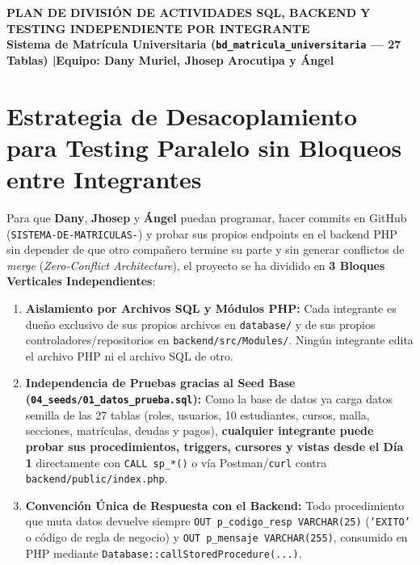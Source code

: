 \documentclass[10pt,a4paper,landscape]{article}
\begin{document}
\begin{center}
    {\LARGE \textbf{\textcolor{unjbgNavy}{PLAN DE DIVISIÓN DE ACTIVIDADES SQL, BACKEND Y TESTING INDEPENDIENTE POR INTEGRANTE}}}\\[3pt]
    {\normalsize \textbf{Sistema de Matrícula Universitaria (\texttt{bd\_matricula\_universitaria} — 27 Tablas) \quad|\quad Equipo: Dany Muriel, Jhosep Arocutipa y Ángel}}\\[4pt]
\end{center}

\section{Estrategia de Desacoplamiento para Testing Paralelo sin Bloqueos entre Integrantes}

Para que \textbf{Dany}, \textbf{Jhosep} y \textbf{Ángel} puedan programar, hacer commits en GitHub (\texttt{SISTEMA-DE-MATRICULAS-}) y probar sus propios endpoints en el backend PHP sin depender de que otro compañero termine su parte y sin generar conflictos de \textit{merge} (\textit{Zero-Conflict Architecture}), el proyecto se ha dividido en \textbf{3 Bloques Verticales Independientes}:

\begin{enumerate}[noitemsep, topsep=2pt, leftmargin=1.4cm]
    \item \textbf{Aislamiento por Archivos SQL y Módulos PHP:} Cada integrante es dueño exclusivo de sus propios archivos en \texttt{database/} y de sus propios controladores/repositorios en \texttt{backend/src/Modules/}. Ningún integrante edita el archivo PHP ni el archivo SQL de otro.
    \item \textbf{Independencia de Pruebas gracias al Seed Base (\texttt{04\_seeds/01\_datos\_prueba.sql}):} Como la base de datos ya carga datos semilla de las 27 tablas (roles, usuarios, 10 estudiantes, cursos, malla, secciones, matrículas, deudas y pagos), \textbf{cualquier integrante puede probar sus procedimientos, triggers, cursores y vistas desde el Día 1} directamente con \texttt{CALL sp\_*()} o vía Postman/\texttt{curl} contra \texttt{backend/public/index.php}.
    \item \textbf{Convención Única de Respuesta con el Backend:} Todo procedimiento que muta datos devuelve siempre \texttt{OUT p\_codigo\_resp VARCHAR(25)} (\texttt{'EXITO'} o código de regla de negocio) y \texttt{OUT p\_mensaje VARCHAR(255)}, consumido en PHP mediante \texttt{Database::callStoredProcedure(...)}.
\end{enumerate}
\end{document}
